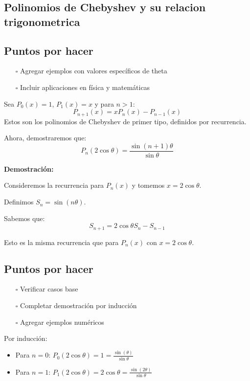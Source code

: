 \subsection{Polinomios de Chebyshev y su relacion trigonometrica}

\subsection{Puntos por hacer}
\begin{itemize}
  \item[$\square$] Agregar ejemplos con valores específicos de theta
  \item[$\square$] Incluir aplicaciones en física y matemáticas
\end{itemize}

Sea $P_0(x) = 1$, $P_1(x) = x$ y para $n > 1$:
\[
    P_{n+1}(x) = x P_n(x) - P_{n-1}(x)
\]
Estos son los polinomios de Chebyshev de primer tipo, definidos por recurrencia.

Ahora, demostraremos que:
\[
    P_n(2 \cos \theta) = \frac{\sin(n+1)\theta}{\sin \theta}
\]

\textbf{Demostración:}

Consideremos la recurrencia para $P_n(x)$ y tomemos $x = 2 \cos \theta$.

Definimos $S_n = \sin(n\theta)$.

Sabemos que:
\[
    S_{n+1} = 2 \cos \theta S_n - S_{n-1}
\]

Esto es la misma recurrencia que para $P_n(x)$ con $x = 2 \cos \theta$.

\subsection{Puntos por hacer}
\begin{itemize}
  \item[$\square$] Verificar casos base
  \item[$\square$] Completar demostración por inducción
  \item[$\square$] Agregar ejemplos numéricos
\end{itemize}

Por inducción:
\begin{itemize}
\item Para $n=0$: $P_0(2\cos\theta) = 1 = \frac{\sin(\theta)}{\sin\theta}$
\item Para $n=1$: $P_1(2\cos\theta) = 2\cos\theta = \frac{\sin(2\theta)}{\sin\theta}$
\end{itemize}


